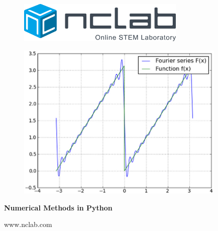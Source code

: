 \documentclass{article}
\begin{document}
\large

\vbox{}
\begin{figure}[!ht]
\includegraphics[width=8cm]{img/logo.png}
\vspace{25mm}
\end{figure}

\begin{figure}[!ht]
\begin{center}
\hspace{-7mm}
\includegraphics[width=10cm]{img/numerical-frontpage.png}
\vspace{25mm}
\end{center}
\end{figure}

\centerline{\Huge \bf Numerical Methods in Python}

\vfill

\centerline{\Large www.nclab.com}

\newpage




\section*{}

\end{document}
